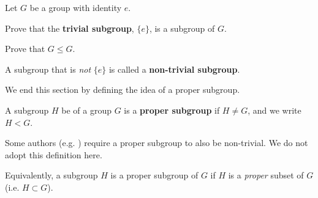 \begin{exercise}
    Let $G$ be a group with identity $e$. 
    \begin{partquestions}{\alph*}
        \item Prove that the \textbf{trivial subgroup}, $\{e\}$, is a subgroup of $G$.
        \item Prove that $G \leq G$.
    \end{partquestions}
\end{exercise}
\begin{remark}
    A subgroup that is \textit{not} $\{e\}$ is called a \textbf{non-trivial subgroup}.
\end{remark}

We end this section by defining the idea of a proper subgroup.
\begin{definition}
    A subgroup $H$ be of a group $G$ is a \textbf{proper subgroup} if $H \neq G$, and we write $H < G$.
\end{definition}
\begin{remark}
    Some authors (e.g. {\cite[p.~32]{hungerford_1980}}) require a proper subgroup to also be non-trivial. We do not adopt this definition here.
\end{remark}
\begin{remark}
    Equivalently, a subgroup $H$ is a proper subgroup of $G$ if $H$ is a \textit{proper} subset of $G$ (i.e. $H \subset G$).
\end{remark}

